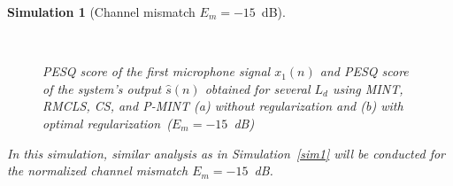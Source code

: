 \documentclass[10pt]{IEEEtran}
\newtheorem{simulation}{Simulation}
\begin{document}
\begin{simulation}[Channel mismatch $E_m=-15$~dB]
\label{sim2}
\begin{figure}[b!]
\centering
\hbox{
}
\caption{PESQ score of the first microphone signal $x_1(n)$ and PESQ score of the system's output $\hat{s}(n)$ obtained for several $L_d$ using MINT, RMCLS, CS, and P-MINT (a) without regularization and (b) with optimal regularization~($E_m = -15$~dB)}
\end{figure}
In this simulation, similar analysis as in Simulation~\ref{sim1} will be conducted for the normalized channel mismatch $E_m = -15$~dB.

\end{simulation}
\end{document}
